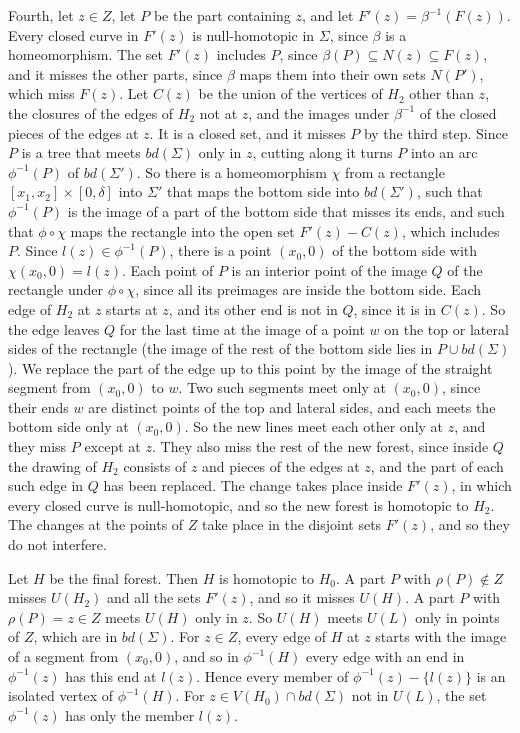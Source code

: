 {Fourth, let $z \in Z$, let $P$ be the part containing $z$, and let $F'(z) = \beta^{-1}(F(z))$. Every
closed curve in $F'(z)$ is null-homotopic in $\Sigma$, since $\beta$ is a homeomorphism. The set
$F'(z)$ includes $P$, since $\beta(P) \subseteq N(z) \subseteq F(z)$, and it misses the other parts,
since $\beta$ maps them into their own sets $N(P')$, which miss $F(z)$. Let $C(z)$ be the union of the
vertices of $H_2$ other than $z$, the closures of the edges of $H_2$ not at $z$, and the images under
$\beta^{-1}$ of the closed pieces of the edges at $z$. It is a closed set, and it misses $P$ by the
third step. Since $P$ is a tree that meets $bd(\Sigma)$ only in $z$, cutting along it turns $P$ into an
arc $\phi^{-1}(P)$ of $bd(\Sigma')$. So there is a homeomorphism $\chi$ from a rectangle
$[x_1, x_2] \times [0, \delta]$ into $\Sigma'$ that maps the bottom side into $bd(\Sigma')$, such that
$\phi^{-1}(P)$ is the image of a part of the bottom side that misses its ends, and such that
$\phi \circ \chi$ maps the rectangle into the open set $F'(z) - C(z)$, which includes $P$. Since
$l(z) \in \phi^{-1}(P)$, there is a point $(x_0, 0)$ of the bottom side with $\chi(x_0, 0) = l(z)$. Each point of $P$ is an interior point of the image $Q$ of the rectangle under
$\phi \circ \chi$, since all its preimages are inside the bottom side. Each edge of $H_2$ at $z$
starts at $z$, and its other end is not in $Q$, since it is in $C(z)$. So the edge leaves $Q$ for the
last time at the image of a point $w$ on the top or lateral sides of the rectangle (the image of the
rest of the bottom side lies in $P \cup bd(\Sigma)$). We replace the part of the edge up to this
point by the image of the straight segment from $(x_0, 0)$ to $w$. Two such segments meet only at
$(x_0, 0)$, since their ends $w$ are distinct points of the top and lateral sides, and each meets the
bottom side only at $(x_0, 0)$. So the new lines meet each other only at $z$, and they miss $P$ except
at $z$. They also miss the rest of the new forest, since inside $Q$ the drawing of $H_2$ consists of $z$
and pieces of the edges at $z$, and the part of each such edge in $Q$ has been replaced. The change
takes place inside $F'(z)$, in which every closed curve is null-homotopic, and so the new forest is
homotopic to $H_2$. The changes at the points of $Z$ take place in the disjoint sets $F'(z)$, and so
they do not interfere.

Let $H$ be the final forest. Then $H$ is homotopic to $H_0$. A part $P$ with $\rho(P) \notin Z$ misses
$U(H_2)$ and all the sets $F'(z)$, and so it misses $U(H)$. A part $P$ with $\rho(P) = z \in Z$ meets
$U(H)$ only in $z$. So $U(H)$ meets $U(L)$ only in points of $Z$, which are in $bd(\Sigma)$. For
$z \in Z$, every edge of $H$ at $z$ starts with the image of a segment from $(x_0, 0)$, and so in
$\phi^{-1}(H)$ every edge with an end in $\phi^{-1}(z)$ has this end at $l(z)$. Hence every member of
$\phi^{-1}(z) - \{l(z)\}$ is an isolated vertex of $\phi^{-1}(H)$. For $z \in V(H_0) \cap bd(\Sigma)$
not in $U(L)$, the set $\phi^{-1}(z)$ has only the member $l(z)$.}


